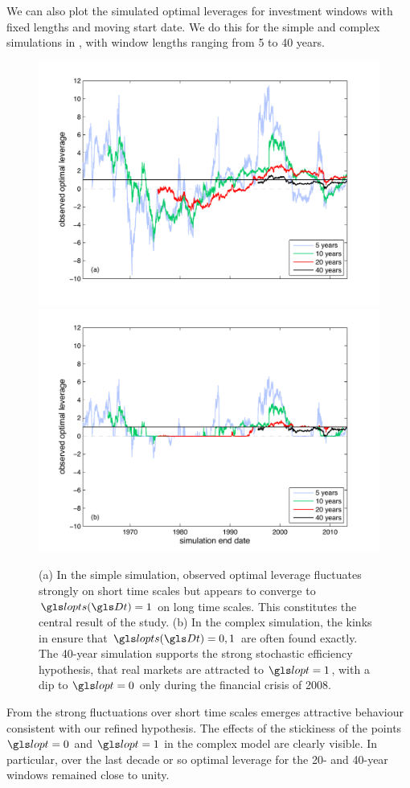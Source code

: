 We can also plot the simulated optimal leverages for investment windows with fixed lengths and moving start date. We do this for the simple and complex simulations in , with window lengths ranging from 5 to 40 years.
\begin{figure}
\includegraphics[width=1.\textwidth]{./chapter_4/figs/sme_fig5a.pdf}
\includegraphics[width=1.\textwidth]{./chapter_4/figs/sme_fig5b.pdf}
\caption{\newline
(a) In the simple simulation, observed optimal leverage fluctuates strongly on short time scales but appears to converge to $\lopts(\Dt)=1$ on long time scales. This constitutes the central result of the study.
\newline
(b) In the complex simulation, the kinks in  ensure that $\lopts(\Dt)=0,1$ are often found exactly. The 40-year simulation supports the strong stochastic efficiency hypothesis, that real markets are attracted to $\lopt=1$, with a dip to $\lopt=0$ only during the financial crisis of 2008. }
\end{figure}
From the strong fluctuations over short time scales emerges attractive behaviour consistent with our refined hypothesis. The effects of the stickiness of the points $\lopt=0$ and $\lopt=1$ in the complex model are clearly visible. In particular, over the last decade or so optimal leverage for the 20- and 40-year windows remained close to unity.

